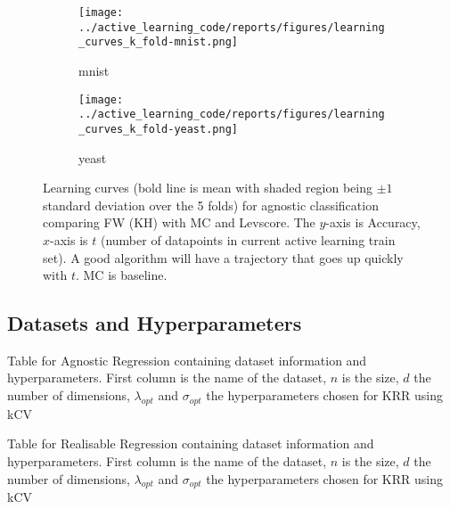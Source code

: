 \begin{figure}[htb]
  \label{figs:agnostic-classification-learning-curves}
  \centering
  \begin{subfigure}[b]{0.48\textwidth}
    \label{fig:learning-curve-agnostic-mnist}
    \texttt{[image: ../active\_learning\_code/reports/figures/learning\_curves\_k\_fold-mnist.png]}
    \caption{mnist}
  \end{subfigure}
  \begin{subfigure}[b]{0.48\textwidth}
    \label{fig:learning-curve-agnostic-yeast}
    \texttt{[image: ../active\_learning\_code/reports/figures/learning\_curves\_k\_fold-yeast.png]}
    \caption{yeast}
  \end{subfigure}
  \caption{Learning curves (bold line is mean with shaded region being \(\pm 1\) standard deviation over the 5 folds) for agnostic classification comparing FW (KH) with MC and
    Levscore. The \(y\)-axis is Accuracy, \(x\)-axis is \(t\)
    (number of datapoints in current active learning train set). A good
    algorithm will have a trajectory that goes up quickly with \(t\). MC is baseline.}
\end{figure}

\FloatBarrier

\subsection{Datasets and Hyperparameters}

\begin{table}[H]
  \centering
  \vspace{0.5cm}
  \caption{Table for Agnostic Regression containing dataset information and hyperparameters.
    First column is the name of the dataset, \(n\) is the size, \(d\) the number of
    dimensions, \(\lambda_{opt}\) and \(\sigma_{opt}\) the hyperparameters chosen
    for KRR using kCV}
\end{table}

\vspace{2cm}
\FloatBarrier

\begin{table}[H]
  \centering
  \vspace{0.5cm}
  \caption{Table for Realisable Regression containing dataset information and hyperparameters.
    First column is the name of the dataset, \(n\) is the size, \(d\) the number of
    dimensions, \(\lambda_{opt}\) and \(\sigma_{opt}\) the hyperparameters chosen
    for KRR using kCV}
\end{table}

